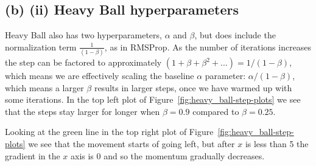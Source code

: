 \subsection{(b) (ii) Heavy Ball hyperparameters}
Heavy Ball also has two hyperparameters, $\alpha$ and $\beta$, but
does include the normalization term $\frac{1}{(1-\beta)}$, as in RMSProp.
As the number of iterations increases the step can be factored
to approximately $(1+\beta+\beta^2+...)=1/(1-\beta)$, which means
we are effectively scaling the baseline $\alpha$ parameter:
$\alpha/(1-\beta)$, which means a larger $\beta$ results
in larger steps, once we have warmed up with some
iterations. In the top left plot of Figure~\ref{fig:heavy_ball-step-plots} we see that the steps stay larger for longer
when $\beta=0.9$ compared to $\beta=0.25$.

Looking at the green line in the top right plot of Figure~\ref{fig:heavy_ball-step-plots} we see that the
movement starts of going left, but after $x$ is less than
5 the gradient in the $x$ axis is 0 and so the
momentum gradually decreases.

